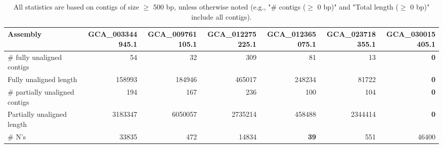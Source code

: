 \documentclass[12pt,a4paper]{article}
\begin{document}
\begin{table}[ht]
\begin{center}
\caption{All statistics are based on contigs of size $\geq$ 500 bp, unless otherwise noted (e.g., "\# contigs ($\geq$ 0 bp)" and "Total length ($\geq$ 0 bp)" include all contigs).}
\begin{tabular}{|l*{6}{|r}|}
\hline
Assembly & GCA\_003344945.1 & GCA\_009761105.1 & GCA\_012275225.1 & GCA\_012365075.1 & GCA\_023718355.1 & GCA\_030015405.1 \\ \hline
\# fully unaligned contigs & 54 & 32 & 309 & 81 & 13 & {\bf 0} \\ \hline
Fully unaligned length & 158993 & 184946 & 465017 & 248234 & 81722 & {\bf 0} \\ \hline
\# partially unaligned contigs & 194 & 167 & 236 & 100 & 104 & {\bf 0} \\ \hline
Partially unaligned length & 3183347 & 6050057 & 2735214 & 458488 & 2344414 & {\bf 0} \\ \hline
\# N's & 33835 & 472 & 14834 & {\bf 39} & 551 & 46400 \\ \hline
\end{tabular}
\end{center}
\end{table}
\end{document}
